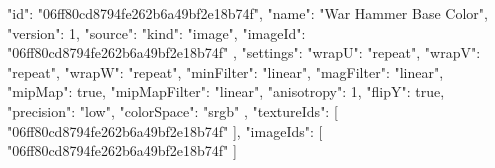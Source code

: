 {
  "id": "06ff80cd8794fe262b6a49bf2e18b74f",
  "name": "War Hammer Base Color",
  "version": 1,
  "source": {
    "kind": "image",
    "imageId": "06ff80cd8794fe262b6a49bf2e18b74f"
  },
  "settings": {
    "wrapU": "repeat",
    "wrapV": "repeat",
    "wrapW": "repeat",
    "minFilter": "linear",
    "magFilter": "linear",
    "mipMap": true,
    "mipMapFilter": "linear",
    "anisotropy": 1,
    "flipY": true,
    "precision": "low",
    "colorSpace": "srgb"
  },
  "textureIds": [
    "06ff80cd8794fe262b6a49bf2e18b74f"
  ],
  "imageIds": [
    "06ff80cd8794fe262b6a49bf2e18b74f"
  ]
}
